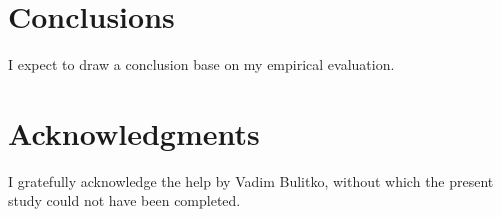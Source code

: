 \documentclass[letterpaper]{article}
\numberwithin{equation}{section}
\numberwithin{theorem}{section}
\numberwithin{lemma}{section}
\numberwithin{df}{section}
\begin{document}
    \section{Conclusions}\label{sec:conclusions}


    I expect to draw a conclusion base on my empirical evaluation.


    \section*{Acknowledgments}

    I gratefully acknowledge the help by Vadim Bulitko, without which the present study could not have been completed.


    
    
\end{document}
